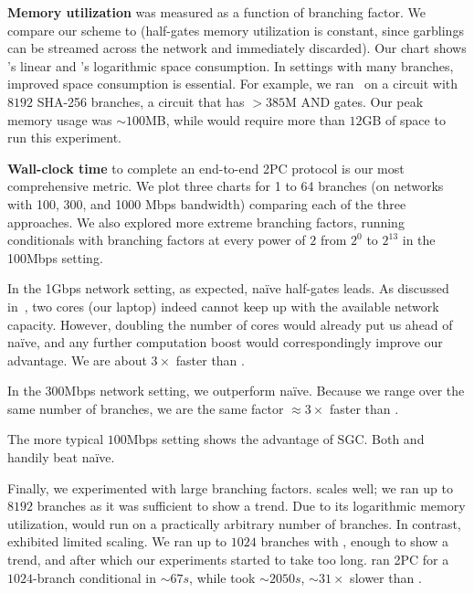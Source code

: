\textbf{Memory utilization} was measured as a function of branching
factor.
We compare our scheme to \stack (half-gates memory utilization is
constant, since garblings
can be streamed across the network and immediately discarded).
%
Our chart shows \stack's linear and
\ourschemelong's logarithmic space consumption.
In settings with many branches, improved space consumption
is essential.
For example, we ran \ourschemelong\ on a circuit
with $8192$ SHA-256 branches, a circuit that has $> 385$M
AND gates.  Our peak memory usage was $\sim 100$MB, while \HK
would require more than $12$GB of space to run this experiment.

\textbf{Wall-clock time} to complete an end-to-end 2PC
protocol is our most comprehensive metric.
We plot three charts for 1 to 64
branches (on networks with 100, 300, and 1000 Mbps bandwidth) comparing each of the three approaches.
We also explored more extreme branching factors, running conditionals with
branching factors at every power of $2$ from $2^0$ to $2^{13}$ in the 100Mbps setting.

In the 1Gbps network setting, as expected, na\"ive half-gates leads.
As discussed in~, two cores (our laptop) indeed
cannot keep up with the available network capacity.  However, doubling
the number of cores would already put us ahead of na\"ive, and any
further computation boost would correspondingly improve
our advantage.  We are about $3\times$ faster than \stack.

In the 300Mbps network setting, we outperform na\"ive.  Because we
range over the same number of branches, we are the same
factor $\approx 3\times$ faster than \stack.

The more typical $100$Mbps setting shows the advantage of SGC.
Both \stack and \ourschemelong handily beat na\"ive.

Finally, we experimented with large branching factors.
\ourschemelong scales well; we ran up to $8192$ branches as it
was sufficient to show a trend.  Due to its logarithmic memory
utilization, \ourschemelong would run on a practically
arbitrary number of branches.  In contrast, \stack exhibited limited
scaling.  We ran up to $1024$ branches with
\stack, enough to show a trend, and after which our experiments
started to take too long.   \ourschemelong ran 2PC for a
$1024$-branch conditional in $\sim 67s$, while \stack took $\sim
2050s$,  $\sim 31\times$ slower than \ourschemelong.


